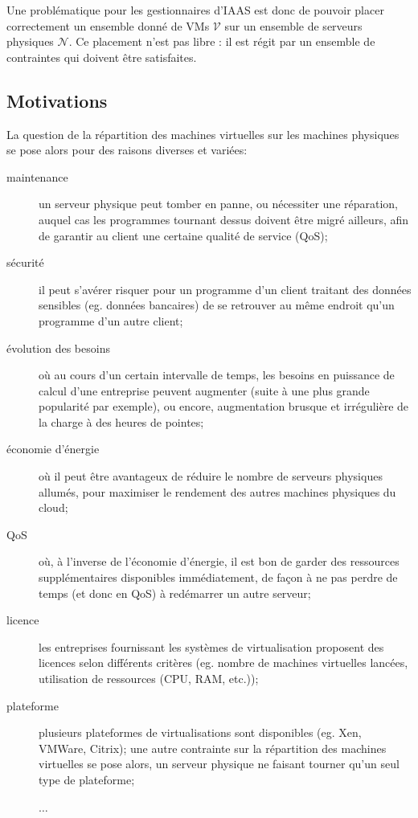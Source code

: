 \documentclass[a4paper]{article}
\begin{document}
Une problématique pour les gestionnaires d'IAAS est donc de pouvoir placer
correctement un ensemble donné de VMs $\mathcal{V}$ sur un ensemble de
serveurs physiques $\mathcal{N}$. Ce placement n'est pas libre : il est
régit par un ensemble de contraintes qui doivent être satisfaites.

\subsection{Motivations}
La question de la répartition des machines virtuelles sur les machines
physiques se pose alors pour des raisons diverses et variées:
\begin{description}
	\item[maintenance] un serveur physique peut tomber en panne, ou
		nécessiter une réparation, auquel cas les programmes
		tournant dessus doivent être migré ailleurs, afin de
		garantir au client une certaine qualité de service (QoS);
	\item[sécurité] il peut s'avérer risquer pour un programme d'un
		client traitant des données sensibles (eg. données bancaires)
		de se retrouver au même endroit qu'un programme d'un
		autre client;
	\item[évolution des besoins] où au cours d'un certain intervalle de
		temps, les besoins en puissance de calcul d'une entreprise
		peuvent augmenter (suite à une plus grande popularité par
		exemple), ou encore, augmentation brusque et irrégulière
		de la charge à des heures de pointes;
	\item[économie d'énergie] où il peut être avantageux de réduire
		le nombre de serveurs physiques allumés, pour maximiser
		le rendement des autres machines physiques du cloud;
	\item[QoS] où, à l'inverse de l'économie d'énergie, il est bon
		de garder des ressources supplémentaires disponibles immédiatement,
		de façon à ne pas perdre de temps (et donc en QoS) à redémarrer
		un autre serveur;		
	\item[licence] les entreprises fournissant les systèmes de virtualisation
		proposent des licences selon différents critères (eg. nombre de
		machines virtuelles lancées, utilisation de ressources (CPU, RAM, etc.));
	\item[plateforme] plusieurs plateformes de virtualisations sont disponibles
		(eg. Xen, VMWare, Citrix); une autre contrainte sur la
		répartition des machines virtuelles se pose alors, un serveur
		physique ne faisant tourner qu'un seul type de plateforme;
	\item[] $\ldots$
\end{description}
\end{document}
